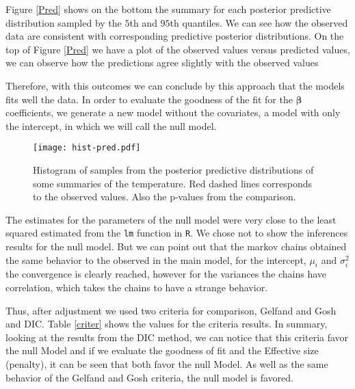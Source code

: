 \documentclass{asaproc}
\begin{document}
Figure \ref{Pred} shows on the bottom the summary for each posterior predictive distribution sampled by the $5$th and $95$th quantiles. We can see how the observed data are consistent with corresponding predictive posterior distributions. On the top of Figure \ref{Pred} we have a plot of the observed values versus predicted values, we can observe how the predictions agree slightly with the observed values

Therefore, with this outcomes we can conclude by this approach that the models fits well the data. In order to evaluate the goodness of the fit for the $\boldsymbol{\beta}$ coefficients, we generate a new model without the covariates, a model with only the intercept, in which we will call the null model. 

\begin{figure}[H]
\centering
\texttt{[image: hist-pred.pdf]}
\caption{Histogram of samples from the posterior predictive distributions of some summaries of the temperature. Red dashed lines corresponds to the observed values. Also the p-values from the comparison.}
\label{FigMC1}
\end{figure}

The estimates for the parameters of the null model were very close to the least squared estimated from the \texttt{lm} function in \texttt{R}. We chose not to show the inferences results for the null model. But we can point out that the markov chains obtained the same behavior to the observed in the main model, for the intercept, $\mu_i$ and $\sigma^2_i$ the convergence is clearly reached, however for the variances the chains have correlation, which takes the chains to have a strange behavior. 

Thus, after adjustment we used two criteria for comparison, Gelfand and Gosh and DIC. Table \ref{criter} shows the values for the criteria results. In summary, looking at the results from the DIC method, we can notice that this criteria favor the null Model and if we evaluate the goodness of fit and the Effective size (penalty), it can be seen that both favor the null Model. As well as the same behavior of the Gelfand and Gosh criteria, the null model is favored. 
\end{document}
